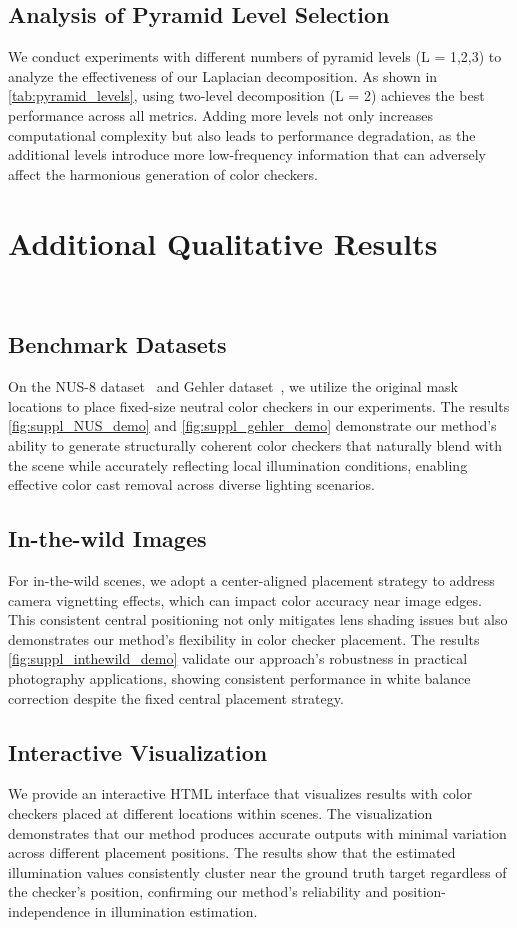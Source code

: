 \subsection{Analysis of Pyramid Level Selection}
We conduct experiments with different numbers of pyramid levels (L = 1,2,3) to analyze the effectiveness of our Laplacian decomposition. As shown in \cref{tab:pyramid_levels}, using two-level decomposition (L = 2) achieves the best performance across all metrics. Adding more levels not only increases computational complexity but also leads to performance degradation, as the additional levels introduce more low-frequency information that can adversely affect the harmonious generation of color checkers.
\section{Additional Qualitative Results}~\label{sec:Qualitative}

\subsection{Benchmark Datasets}
On the NUS-8 dataset~\cite{cheng2014illuminant} and Gehler dataset~\cite{4587765}, we utilize the original mask locations to place fixed-size neutral color checkers in our experiments. The results \cref{fig:suppl_NUS_demo} and \cref{fig:suppl_gehler_demo} demonstrate our method's ability to generate structurally coherent color checkers that naturally blend with the scene while accurately reflecting local illumination conditions, enabling effective color cast removal across diverse lighting scenarios.

\subsection{In-the-wild Images}
For in-the-wild scenes, we adopt a center-aligned placement strategy to address camera vignetting effects, which can impact color accuracy near image edges. This consistent central positioning not only mitigates lens shading issues but also demonstrates our method's flexibility in color checker placement. The results \cref{fig:suppl_inthewild_demo} validate our approach's robustness in practical photography applications, showing consistent performance in white balance correction despite the fixed central placement strategy.
\subsection{Interactive Visualization}
We provide an interactive HTML interface that visualizes results with color checkers placed at different locations within scenes. The visualization demonstrates that our method produces accurate outputs with minimal variation across different placement positions. The results show that the estimated illumination values consistently cluster near the ground truth target regardless of the checker's position, confirming our method's reliability and position-independence in illumination estimation.

